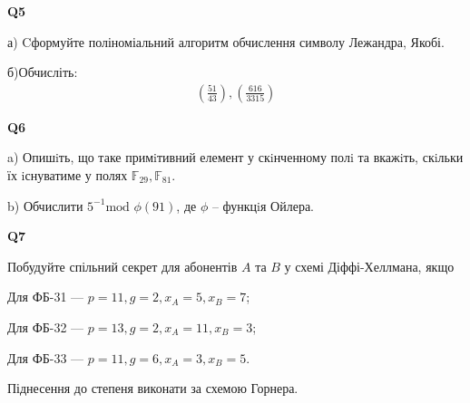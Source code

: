 \documentclass{../../test-template}
\begin{document}
\begin{tcolorbox}[lowerbox=invisible,colback=white]
    \begin{minipage}{0.1\textwidth}
        \raggedright
        \vspace*{\fill}
            \textbf{Q5}
        \vspace*{\fill}
        \end{minipage}
        \begin{minipage}{0.75\textwidth}
        а) Cформуйте поліноміальний алгоритм обчислення символу Лежандра, Якобі. 
        
        б)Обчисліть:
        \begin{align*}
            \left(\frac{51}{43}\right),\left(\frac{616}{3315}\right)
        \end{align*}
        \end{minipage}
\end{tcolorbox}

\begin{tcolorbox}[lowerbox=invisible,colback=white]
    \begin{minipage}{0.1\textwidth}
        \raggedright
        \vspace*{\fill}
            \textbf{Q6}
        \vspace*{\fill}
        \end{minipage}
        \begin{minipage}{0.75\textwidth}
        a) Опишiть, що таке примiтивний елемент у скiнченному полi та вкажiть, скiльки їх iснуватиме у полях $\mathbb{F}_{29}, \mathbb{F}_{81}$.

        b) Обчислити $5^{-1}\text{mod }\phi(91)$, де $\phi$ -- функцiя Ойлера.
        \end{minipage}
\end{tcolorbox}

\begin{tcolorbox}[lowerbox=invisible,colback=white]
    \begin{minipage}{0.1\textwidth}
        \raggedright
        \vspace*{\fill}
            \textbf{Q7}
        \vspace*{\fill}
        \end{minipage}
        \begin{minipage}{0.75\textwidth}
         Побудуйте спільний секрет для абонентів $A$ та $B$ у схемі Діффі-Хеллмана, якщо 
\par Для ФБ-31 --- $p = 11, g= 2, x_A=5, x_B=7$;
\par Для ФБ-32 --- $p = 13, g =2, x_A=11, x_B=3$;
\par Для ФБ-33 --- $p = 11, g= 6, x_A= 3, x_B=5$.
\par Піднесення до степеня виконати за схемою Горнера.
        \end{minipage}
\end{tcolorbox}
\end{document}

